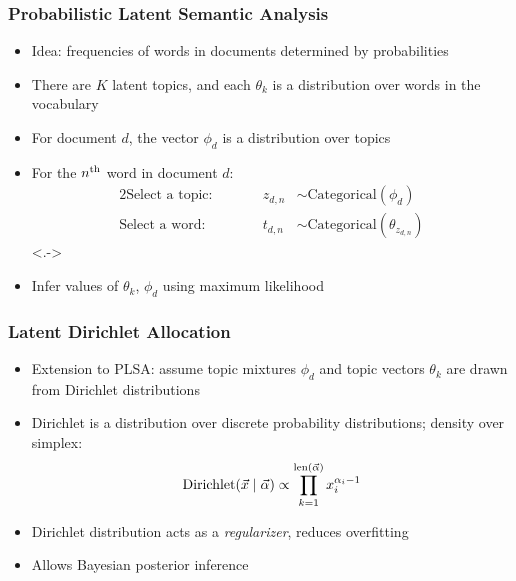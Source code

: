 \begin{frame}
\frametitle{Probabilistic Latent Semantic Analysis}
\begin{itemize}[<+->]
\item Idea: frequencies of words in documents determined by probabilities
\item There are $K$ latent topics, and each $\theta_k$ is a distribution over words in the vocabulary
\item For document $d$, the vector $\phi_d$ is a distribution over topics
\item For the $n^{\text{th}}$ word in document $d$:
\begin{alignat*}{2}
\text{Select a topic:}&\qquad& z_{d,n} &\sim \text{Categorical}(\phi_d) \\
\text{Select a word:}&\qquad& t_{d,n} &\sim \text{Categorical}(\theta_{z_{d,n}})
\end{alignat*}
\onslide<.->
\begin{center}
\end{center}
\end{itemize}

\begin{itemize}[<+->]
\item Infer values of $\theta_k$, $\phi_d$ using maximum likelihood
\end{itemize}
\end{frame}

\begin{frame}
\frametitle{Latent Dirichlet Allocation}
\begin{itemize}[<+->]
\item Extension to PLSA: assume topic mixtures $\phi_d$ and topic vectors $\theta_k$ are drawn from Dirichlet distributions
\item Dirichlet is a distribution over discrete probability distributions; density over simplex:
\[ \text{Dirichlet}(\vec x \mid \vec \alpha) \propto \prod_{k=1}^{\mathop{\text{len}}(\vec\alpha)} x_i^{\alpha_i - 1} \]
\item Dirichlet distribution acts as a \emph{regularizer}, reduces overfitting
\item Allows Bayesian posterior inference
\end{itemize}
\end{frame}


